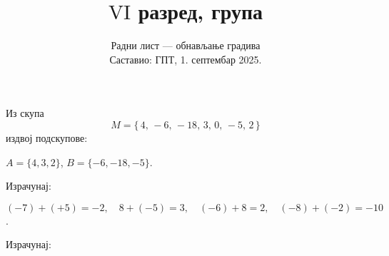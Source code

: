\documentclass[10pt,a5paper,addpoints]{exam}
\title{$\mathrm{VI}$ разред, група \grupa 1234}
\author{Радни лист — обнављање градива \\ Саставио: ГПТ, 1. септембар 2025.}
\date{}
\begin{document}
\maketitle
\thispagestyle{headandfoot}

\begin{questions}

\question
Из скупа
\[
 M=\{\,4,\,-6,\,-18,\,3,\,0,\,-5,\,2\,\}
\]
издвој подскупове:

\begin{solution}[\stretch 2]
$A=\{4,3,2\}$, $B=\{-6,-18,-5\}$.
\end{solution}

\question
Израчунај:
\begin{multicols}{2}
\end{multicols}

\begin{solution}[\stretch 2]
$(-7)+(+5)=-2,\quad 8+(-5)=3,\quad (-6)+8=2,\quad (-8)+(-2)=-10$.
\end{solution}

\ifprintanswers\else\newpage\fi

\question
Израчунај:
\begin{parts}

\end{parts}
\end{questions}
\end{document}
